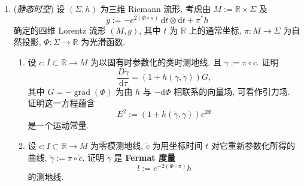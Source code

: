 \begin{RiemannExercise}
\begin{enumerate}[label=(\arabic*),ref=\arabic*,leftmargin=*]
\begin{enumerate}[label=(\alph*),leftmargin=*]
\[
  (\mathrm{d}\pi)_pu^\dagger=u
  \qquad\text{且}\qquad
  g\left(u^\dagger,\left(\frac{\partial}{\partial t}\right)_p\right)=0.
\]
证明 $h$ 是良定义的, 且
\[
  h=\mathrm{d}r\otimes\mathrm{d}r+\frac{r^2}{1-\omega^2r^2}\,
       \mathrm{d}\theta'\otimes\mathrm{d}\theta'+\mathrm{d}z\otimes\mathrm{d}z.
\]
(\textbf{注}: 这是旋转观察者之间作局部距离测量所得的度量; Einstein 利用这一度量有曲率的事实, 论证了在引力的相对论描述中采用非 Euclidean 几何的必要性.)
\item 若曲线 $c:I\subset\mathbb{R}\to U$ 在每一点的切向量 $\dot c$ 都与 $\frac{\partial}{\partial t}$ 正交, 则从旋转观察者的观点看, $c$ 的像由同时发生的事件组成. 证明这等价于要求 $\alpha(\dot c)=0$, 其中
\[
  \alpha=\mathrm{d}t-\frac{\omega r^2}{1-\omega^2r^2}\,\mathrm{d}\theta'.
\]
特别地, 证明一般而言, 沿闭合路径同步旋转观察者的时钟会产生不一致.

(\textbf{注}: 这就是所谓的 \textbf{Sagnac 效应}; 由于地球自转, 同步 GPS 系统地面站中精度很高的原子钟时, 必须考虑这种效应.)
\end{enumerate}
\item\label{ex:static-spacetime-and-fermat-metric}
(\emph{静态时空}) 设 $(\Sigma,h)$ 为三维 Riemann 流形, 考虑由 $M:=\mathbb{R}\times\Sigma$ 及
\[
  g:=-e^{2(\Phi\circ\pi)}\,\mathrm{d}t\otimes\mathrm{d}t+\pi^*h
\]
确定的四维 Lorentz 流形 $(M,g)$, 其中 $t$ 为 $\mathbb{R}$ 上的通常坐标, $\pi:M\to\Sigma$ 为自然投影, $\Phi:\Sigma\to\mathbb{R}$ 为光滑函数.
\begin{enumerate}[label=(\alph*),leftmargin=*]
\item 设 $c:I\subset\mathbb{R}\to M$ 为以固有时参数化的类时测地线, 且 $\gamma:=\pi\circ c$. 证明
\[
  \frac{D\dot\gamma}{\mathrm{d}\tau}=(1+h(\dot\gamma,\dot\gamma))G,
\]
其中 $G=-\operatorname{grad}(\Phi)$ 为由 $h$ 与 $-\mathrm{d}\Phi$ 相联系的向量场, 可看作引力场. 证明这一方程蕴含
\[
  E^2:=(1+h(\dot\gamma,\dot\gamma))e^{2\Phi}
\]
是一个运动常量.
\item 设 $c:I\subset\mathbb{R}\to M$ 为零模测地线, $\widetilde c$ 为用坐标时间 $t$ 对它重新参数化所得的曲线, $\widetilde\gamma:=\pi\circ\widetilde c$. 证明 $\widetilde\gamma$ 是 \textbf{Fermat 度量}
\[
  l:=e^{-2(\Phi\circ\pi)}h
\]
的测地线.


\end{enumerate}
\end{enumerate}
\end{RiemannExercise}
